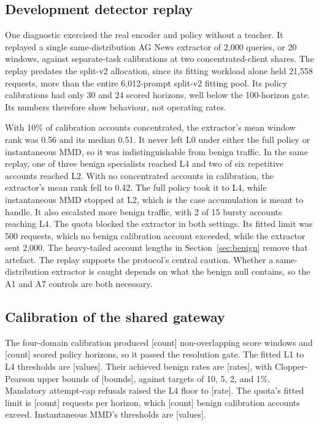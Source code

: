 \documentclass[journal]{IEEEtran}
\newcommand{\tbd}[1]{\textcolor{red!65!black}{[#1]}}
\begin{document}
\subsection{Development detector replay}
\label{sec:diagnostic}
One diagnostic exercised the real encoder and policy without a teacher. It replayed a single same-distribution AG News extractor of 2,000 queries, or 20 windows, against separate-task calibrations at two concentrated-client shares. The replay predates the split-v2 allocation, since its fitting workload alone held 21,558 requests, more than the entire 6,012-prompt split-v2 fitting pool. Its policy calibrations had only 30 and 24 scored horizons, well below the 100-horizon gate. Its numbers therefore show behaviour, not operating rates.

With 10\% of calibration accounts concentrated, the extractor's mean window rank was 0.56 and its median 0.51. It never left L0 under either the full policy or instantaneous MMD, so it was indistinguishable from benign traffic. In the same replay, one of three benign specialists reached L4 and two of six repetitive accounts reached L2. With no concentrated accounts in calibration, the extractor's mean rank fell to 0.42. The full policy took it to L4, while instantaneous MMD stopped at L2, which is the case accumulation is meant to handle. It also escalated more benign traffic, with 2 of 15 bursty accounts reaching L4. The quota blocked the extractor in both settings. Its fitted limit was 500 requests, which no benign calibration account exceeded, while the extractor sent 2,000. The heavy-tailed account lengths in Section~\ref{sec:benign} remove that artefact. The replay supports the protocol's central caution. Whether a same-distribution extractor is caught depends on what the benign null contains, so the A1 and A7 controls are both necessary.

\subsection{Calibration of the shared gateway}
The four-domain calibration produced \tbd{count} non-overlapping score windows and \tbd{count} scored policy horizons, so it passed the resolution gate. The fitted L1 to L4 thresholds are \tbd{values}. Their achieved benign rates are \tbd{rates}, with Clopper-Pearson upper bounds of \tbd{bounds}, against targets of 10, 5, 2, and 1\%. Mandatory attempt-cap refusals raised the L4 floor to \tbd{rate}. The quota's fitted limit is \tbd{count} requests per horizon, which \tbd{count} benign calibration accounts exceed. Instantaneous MMD's thresholds are \tbd{values}.
\end{document}
